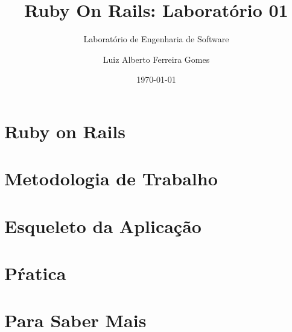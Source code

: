 \documentclass[t, 				             
			   final,
			   12pt, 				         
			   xcolor={usenames,dvipsnames}, 
			   table]{beamer}
\begin{document}
    \author{Luiz Alberto Ferreira Gomes}
    \title{Ruby On Rails: Laboratório 01}
    \subtitle{Laboratório de Engenharia de Software}
    \date{\today}

	
	  	
    
    \section{Ruby on Rails}
		
	
	
	
    
    \section{Metodologia de Trabalho}
    

    \section{Esqueleto da Aplicação}
    
   
    \section{Pŕatica}
    

    \section{Para Saber Mais}
    
\end{document}
